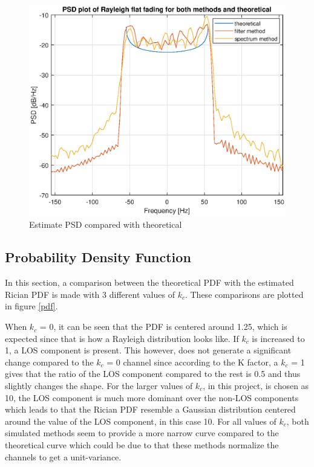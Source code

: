 \documentclass[conference]{IEEEtran}
\begin{document}
    \begin{figure}[H]
        \centering
        \includegraphics[width = \linewidth]{Figures/PSD_test.eps}
        \caption{Estimate PSD compared with theoretical}
        \label{PSD}
    \end{figure}

\subsection{Probability Density Function }
    In this section, a comparison between the theoretical PDF with the estimated Rician PDF is made with 3 different values of $k_{c}$. These comparisons are plotted in figure \ref{pdf}.
    
    When $k_{c}$ = 0, it can be seen that the PDF is centered around 1.25, which is expected since that is how a Rayleigh distribution looks like.
    If $k_{c}$ is increased to 1, a LOS component is present. This however, does not generate a significant change compared to the $k_{c}$ = 0 channel since according to the K factor, a $k_c$ = 1 gives that the ratio of the LOS component compared to the rest is 0.5 and thus slightly changes the shape.  
    For the larger values of $k_{c}$, in this project, is chosen as 10, the LOS component is much more dominant over the non-LOS components which leads to that the Rician PDF resemble a Gaussian distribution centered around the value of the LOS component, in this case 10. 
    For all values of $k_c$, both simulated methods seem to provide a more narrow curve compared to the theoretical curve which could be due to that these methods normalize the channels to get a unit-variance.
  
\end{document}
